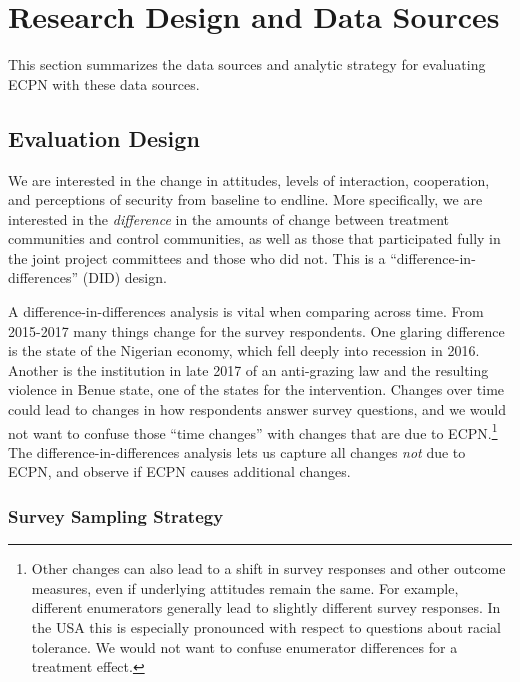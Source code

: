 \documentclass[
]{article}
\begin{document}
\hypertarget{research-design-and-data-sources}{%
\section{Research Design and Data
Sources}\label{research-design-and-data-sources}}

This section summarizes the data sources and analytic strategy for
evaluating ECPN with these data sources.

\hypertarget{evaluation-design}{%
\subsection{Evaluation Design}\label{evaluation-design}}

We are interested in the change in attitudes, levels of interaction,
cooperation, and perceptions of security from baseline to endline. More
specifically, we are interested in the \emph{difference} in the amounts
of change between treatment communities and control communities, as well
as those that participated fully in the joint project committees and
those who did not. This is a ``difference-in-differences'' (DID) design.

A difference-in-differences analysis is vital when comparing across
time. From 2015-2017 many things change for the survey respondents. One
glaring difference is the state of the Nigerian economy, which fell
deeply into recession in 2016. Another is the institution in late 2017
of an anti-grazing law and the resulting violence in Benue state, one of
the states for the intervention. Changes over time could lead to changes
in how respondents answer survey questions, and we would not want to
confuse those ``time changes'' with changes that are due to
ECPN.\footnote{Other changes can also lead to a shift in survey
  responses and other outcome measures, even if underlying attitudes
  remain the same. For example, different enumerators generally lead to
  slightly different survey responses. In the USA this is especially
  pronounced with respect to questions about racial tolerance. We would
  not want to confuse enumerator differences for a treatment effect.}
The difference-in-differences analysis lets us capture all changes
\emph{not} due to ECPN, and observe if ECPN causes additional changes.

\hypertarget{survey-sampling-strategy}{%
\subsubsection{Survey Sampling
Strategy}\label{survey-sampling-strategy}}
\end{document}
